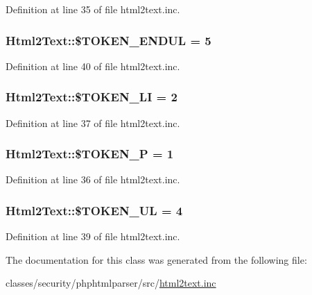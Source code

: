 Definition at line 35 of file html2text.\+inc.

\hypertarget{classHtml2Text_aa5aafc2e0f4c2038185ae09fcc3521d2}{
\subsubsection[{\$\+T\+O\+K\+E\+N\+\_\+\+E\+N\+D\+U\+L}]{\setlength{\rightskip}{0pt plus 5cm}Html2\+Text\+::\$\+T\+O\+K\+E\+N\+\_\+\+E\+N\+D\+U\+L = 5}}\label{classHtml2Text_aa5aafc2e0f4c2038185ae09fcc3521d2}


Definition at line 40 of file html2text.\+inc.

\hypertarget{classHtml2Text_aadb27ed8819d414ef85c71c3f7f367ba}{
\subsubsection[{\$\+T\+O\+K\+E\+N\+\_\+\+L\+I}]{\setlength{\rightskip}{0pt plus 5cm}Html2\+Text\+::\$\+T\+O\+K\+E\+N\+\_\+\+L\+I = 2}}\label{classHtml2Text_aadb27ed8819d414ef85c71c3f7f367ba}


Definition at line 37 of file html2text.\+inc.

\hypertarget{classHtml2Text_a4d94686f1b18fda5460b9a208d89a98d}{
\subsubsection[{\$\+T\+O\+K\+E\+N\+\_\+\+P}]{\setlength{\rightskip}{0pt plus 5cm}Html2\+Text\+::\$\+T\+O\+K\+E\+N\+\_\+\+P = 1}}\label{classHtml2Text_a4d94686f1b18fda5460b9a208d89a98d}


Definition at line 36 of file html2text.\+inc.

\hypertarget{classHtml2Text_a21920236a8173543887975c3d657a81c}{
\subsubsection[{\$\+T\+O\+K\+E\+N\+\_\+\+U\+L}]{\setlength{\rightskip}{0pt plus 5cm}Html2\+Text\+::\$\+T\+O\+K\+E\+N\+\_\+\+U\+L = 4}}\label{classHtml2Text_a21920236a8173543887975c3d657a81c}


Definition at line 39 of file html2text.\+inc.



The documentation for this class was generated from the following file\+:\begin{DoxyCompactItemize}
\item 
classes/security/phphtmlparser/src/\hyperlink{html2text_8inc}{html2text.\+inc}\end{DoxyCompactItemize}
